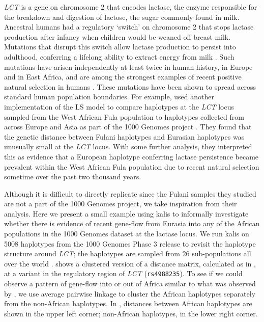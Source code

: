 \documentclass[pdflatex,referee,lineno,sn-nature]{sn-jnl}%
\newcommand{\pkg}[1]{{\fontseries{m}\fontseries{b}\selectfont #1}}
\begin{document}
\emph{LCT} is a gene on chromosome 2 that encodes lactase, the enzyme responsible for the breakdown and digestion of lactose, the sugar commonly found in milk.
Ancestral humans had a regulatory `switch' on chromosome 2 that stops lactase production after infancy when children would be weaned off breast milk.
Mutations that disrupt this switch allow lactase production to persist into adulthood, conferring a lifelong ability to extract energy from milk \cite{ingram2009lactose}.
Such mutations have arisen independently at least twice in human history, in Europe and in East Africa, and are among the strongest examples of recent positive natural selection in humans \cite{ranciaro2014genetic, bersaglieri2004genetic}.
These mutations have been shown to spread across standard human population boundaries.
For example, \cite{busby2017inferring} used another implementation of the LS model to compare haplotypes at the \emph{LCT} locus sampled from the West African Fula population to haplotypes collected from across Europe and Asia as part of the 1000 Genomes project \cite{10002015global}.
They found that the genetic distance between Fulani haplotypes and Eurasian haplotypes was unusually small at the \emph{LCT} locus.
With some further analysis, they interpreted this as evidence that a European haplotype conferring lactase persistence became prevalent within the West African Fula population due to recent natural selection sometime over the past two thousand years.

Although it is difficult to directly replicate \cite{busby2017inferring} since the Fulani samples they studied are not a part of the 1000 Genomes project, we take inspiration from their analysis.
Here we present a small example using kalis to informally investigate whether there is evidence of recent gene-flow from Eurasia into any of the African populations in the 1000 Genomes dataset at the lactase locus.
We run \pkg{kalis} on 5008 haplotypes from the 1000 Genomes Phase 3 release to revisit the haplotype structure around \emph{LCT}; the haplotypes are sampled from 26 sub-populations all over the world \cite{10002015global}.
 shows a clustered version of a distance matrix, calculated as in , at a variant in the regulatory region of \emph{LCT} (\texttt{rs4988235}).
To see if we could observe a pattern of gene-flow into or out of Africa similar to what was observed by \cite{busby2017inferring}, we use average pairwise linkage \cite{sokal1958statistical} to cluster the African haplotypes separately from the non-African haplotypes. In , distances between African haplotypes are shown in the upper left corner; non-African haplotypes, in the lower right corner.
\end{document}

